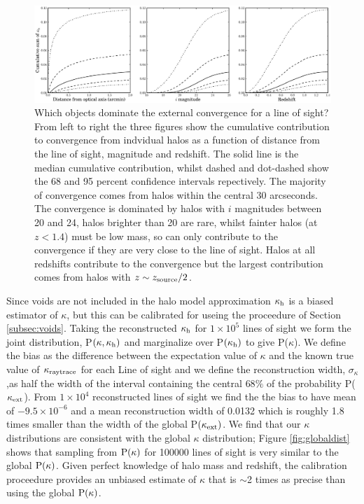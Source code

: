 \documentclass[useAMS,usenatbib]{mn2e}
\begin{document}
\begin{figure}
\includegraphics[width=\textwidth]{figs/where_is_the_kappa.eps}
\caption[magcut]{Which objects dominate the external convergence for a line of sight? From left to right the three figures show the cumulative contribution to convergence from indvidual halos as a function of distance from the line of sight, magnitude and redshift. The solid line is the median cumulative contribution, whilst dashed and dot-dashed show the 68 and 95 percent confidence intervals repectively. The majority of convergence comes from halos within the central 30 arcseconds. The convergence is dominated by halos with $i$ magnitudes between 20 and 24, halos brighter than 20 are rare, whilst fainter halos (at $z<1.4$) must be low mass, so can only contribute to the convergence if they are very close to the line of sight. Halos at all redshifts contribute to the convergence but the largest contribution comes from halos with $z \sim z_{\rm source}/2$.}
\label{fig:where}
\end{figure}

Since voids are not included in the halo model approximation $\kappa_{\rm h}$ is a biased estimator of $\kappa$, but this can be calibrated for useing the proceedure of Section \ref{subsec:voids}. Taking the reconstructed $\kappa_{\rm h}$ for $1\times 10^{5}$ lines of sight we form the joint distribution, P$(\kappa,\kappa_{\rm h})$ and marginalize over P$(\kappa_{\rm h})$ to give P($\kappa$). We define the bias as the difference between the expectation value of $\kappa$ and the known true value of $\kappa_{\rm raytrace}$ for each Line of sight and we define the reconstruction width, $\sigma_{\kappa}$,as half the width of the interval containing the central $68\%$ of the probability P($\kappa_{\rm ext}$). From $1\times 10^{4}$ reconstructed lines of sight we find the the bias to have mean of $-9.5\times 10^{-6}$ and a mean reconstruction width of 0.0132 which is roughly 1.8 times smaller than the width of the global P$(\kappa_{\rm ext})$. We find that our $\kappa$ distributions are consistent with the global $\kappa$ distribution; Figure \ref{fig:globaldist} shows that sampling from ${\rm P}(\kappa)$ for 100000 lines of sight is very similar to the global ${\rm P}(\kappa)$. Given perfect knowledge of halo mass and redshift, the calibration proceedure provides an unbiased estimate of $\kappa$ that is $\sim$2 times as precise than using the global ${\rm P}(\kappa)$.
\end{document}
